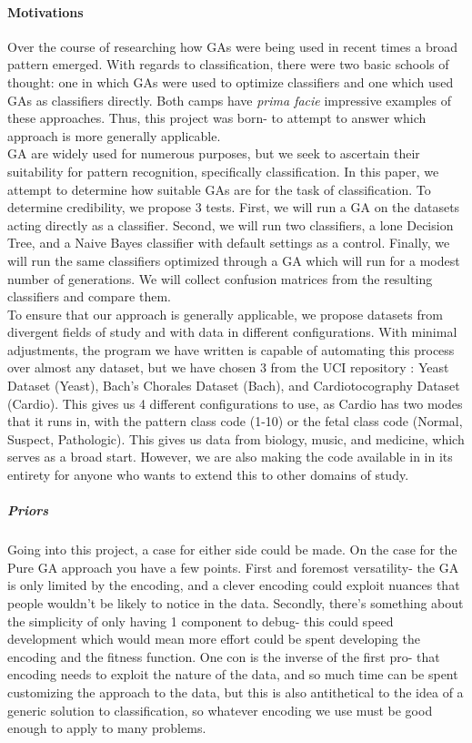 \paragraph{Motivations}
Over the course of researching how GAs were being used in recent times a broad pattern emerged.  With regards to classification, there were two basic schools of thought:  one in which GAs were used to optimize classifiers and one which used GAs as classifiers directly.  Both camps have \textit{prima facie} impressive examples of these approaches.  Thus, this project was born- to attempt to answer which approach is more generally applicable.\\
GA are widely used for numerous purposes, but we seek to ascertain their suitability for pattern recognition, specifically classification.  In this paper, we attempt to determine how suitable GAs are for the task of classification.  To determine credibility, we propose 3 tests.  First, we will run a GA on the datasets acting directly as a classifier.  Second, we will run two classifiers, a lone Decision Tree, and a Naive Bayes classifier with default settings as a control.  Finally, we will run the same classifiers optimized through a GA which will run for a modest number of generations.  We will collect confusion matrices from the resulting classifiers and compare them.\\
To ensure that our approach is generally applicable, we propose datasets from divergent fields of study and with data in different configurations.  With minimal adjustments, the program we have written is capable of automating this process over almost any dataset, but we have chosen 3 from the UCI repository\cite{lichman_uci_2013} : Yeast Dataset (Yeast)\cite{paul_horton_uci_1996}, Bach's Chorales Dataset (Bach)\cite{daniele_p._radicioni_uci_2014}, and Cardiotocography Dataset (Cardio)\cite{j._p._marques_de_sa_uci_2010}.  This gives us 4 different configurations to use, as Cardio has two modes that it runs in, with the pattern class code (1-10) or the fetal class code (Normal, Suspect, Pathologic).  This gives us data from biology, music, and medicine, which serves as a broad start.  However, we are also making the code available in in its entirety for anyone who wants to extend this to other domains of study.\\
\subparagraph{Priors}
Going into this project, a case for either side could be made.  On the case for the Pure GA approach you have a few points.  First and foremost versatility- the GA is only limited by the encoding, and a clever encoding could exploit nuances that people wouldn't be likely to notice in the data.  Secondly, there's something about the simplicity of only having 1 component to debug- this could speed development which would mean more effort could be spent developing the encoding and the fitness function.  One con is the inverse of the first pro- that encoding needs to exploit the nature of the data, and so much time can be spent customizing the approach to the data, but this is also antithetical to the idea of a generic solution to classification, so whatever encoding we use must be good enough to apply to many problems.\\
